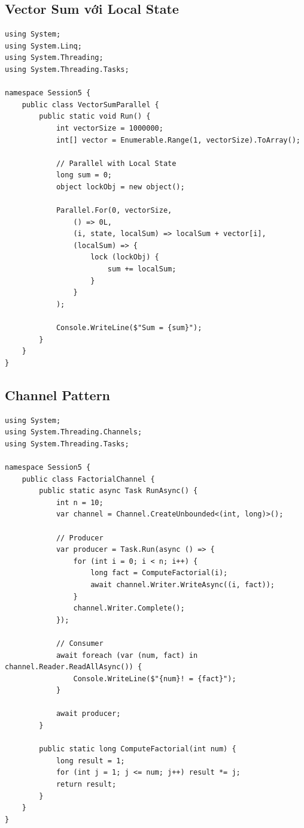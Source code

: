 \subsection{Vector Sum với Local State}

\begin{lstlisting}[style=csharpstyle, caption={VectorSumParallel.cs}]
using System;
using System.Linq;
using System.Threading;
using System.Threading.Tasks;

namespace Session5 {
    public class VectorSumParallel {
        public static void Run() {
            int vectorSize = 1000000;
            int[] vector = Enumerable.Range(1, vectorSize).ToArray();
            
            // Parallel with Local State
            long sum = 0;
            object lockObj = new object();
            
            Parallel.For(0, vectorSize,
                () => 0L,
                (i, state, localSum) => localSum + vector[i],
                (localSum) => {
                    lock (lockObj) {
                        sum += localSum;
                    }
                }
            );
            
            Console.WriteLine($"Sum = {sum}");
        }
    }
}
\end{lstlisting}

\subsection{Channel Pattern}

\begin{lstlisting}[style=csharpstyle, caption={FactorialChannel.cs}]
using System;
using System.Threading.Channels;
using System.Threading.Tasks;

namespace Session5 {
    public class FactorialChannel {
        public static async Task RunAsync() {
            int n = 10;
            var channel = Channel.CreateUnbounded<(int, long)>();
            
            // Producer
            var producer = Task.Run(async () => {
                for (int i = 0; i < n; i++) {
                    long fact = ComputeFactorial(i);
                    await channel.Writer.WriteAsync((i, fact));
                }
                channel.Writer.Complete();
            });
            
            // Consumer
            await foreach (var (num, fact) in channel.Reader.ReadAllAsync()) {
                Console.WriteLine($"{num}! = {fact}");
            }
            
            await producer;
        }
        
        public static long ComputeFactorial(int num) {
            long result = 1;
            for (int j = 1; j <= num; j++) result *= j;
            return result;
        }
    }
}
\end{lstlisting}

